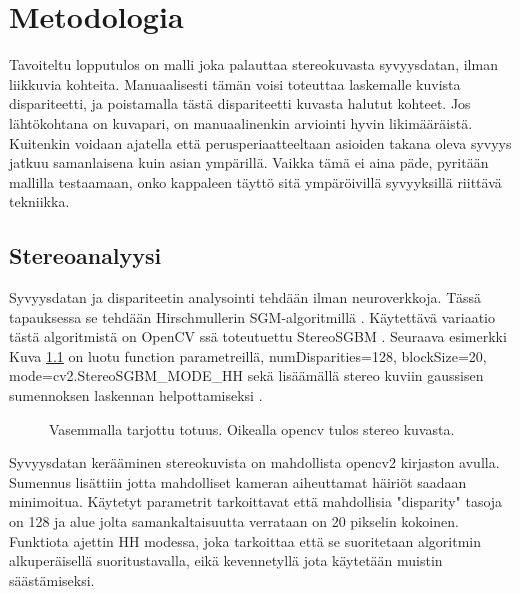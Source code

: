 \chapter{Metodologia}
\label{ch:metodologia}

Tavoiteltu lopputulos on malli joka palauttaa stereokuvasta syvyysdatan, ilman liikkuvia kohteita.
Manuaalisesti tämän voisi toteuttaa laskemalle kuvista dispariteetti, ja poistamalla tästä dispariteetti kuvasta halutut kohteet.
Jos lähtökohtana on kuvapari, on manuaalinenkin arviointi hyvin likimääräistä. Kuitenkin voidaan ajatella että perusperiaatteeltaan asioiden takana oleva syvyys jatkuu samanlaisena kuin asian ympärillä.
Vaikka tämä ei aina päde, pyritään mallilla testaamaan, onko kappaleen täyttö sitä ympäröivillä syvyyksillä riittävä tekniikka.

\section{Stereoanalyysi}

Syvyysdatan ja dispariteetin analysointi tehdään ilman neuroverkkoja.
Tässä tapauksessa se tehdään Hirschmullerin SGM-algoritmillä \cite{hirschmuller2005babel}.
Käytettävä variaatio tästä algoritmistä on OpenCV ssä toteutuettu StereoSGBM \cite{opencvsgbm}.
Seuraava esimerkki Kuva  \ref{fig:disparity1} on luotu function parametreillä, numDisparities=128, blockSize=20, mode=cv2.StereoSGBM\_MODE\_HH
sekä lisäämällä stereo kuviin gaussisen sumennoksen laskennan helpottamiseksi \cite{AnShiyong2021Asvs}.

\begin{figure}[h]
\centering
{}
\caption[Tämä on lyhyt kuvateksti.]{Vasemmalla tarjottu totuus. Oikealla opencv tulos stereo kuvasta.}
\label{fig:disparity1}
\end{figure}
    
Syvyysdatan kerääminen stereokuvista on mahdollista opencv2 kirjaston avulla.
Sumennus lisättiin jotta mahdolliset kameran aiheuttamat häiriöt saadaan minimoitua.
Käytetyt parametrit tarkoittavat että mahdollisia "disparity" tasoja on 128 ja alue jolta samankaltaisuutta verrataan on 20 pikselin kokoinen.
Funktiota ajettin HH modessa, joka tarkoittaa että se suoritetaan algoritmin alkuperäisellä suoritustavalla, 
eikä kevennetyllä jota käytetään muistin säästämiseksi.

